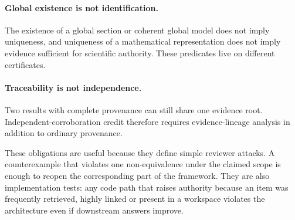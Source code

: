 \paragraph{Global existence is not identification.}
The existence of a global section or coherent global model does not imply uniqueness, and uniqueness of a mathematical representation does not imply evidence sufficient for scientific authority. These predicates live on different certificates.

\paragraph{Traceability is not independence.}
Two results with complete provenance can still share one evidence root. Independent-corroboration credit therefore requires evidence-lineage analysis in addition to ordinary provenance.

These obligations are useful because they define simple reviewer attacks. A counterexample that violates one non-equivalence under the claimed scope is enough to reopen the corresponding part of the framework. They are also implementation tests: any code path that raises authority because an item was frequently retrieved, highly linked or present in a workspace violates the architecture even if downstream answers improve.
\endgroup

